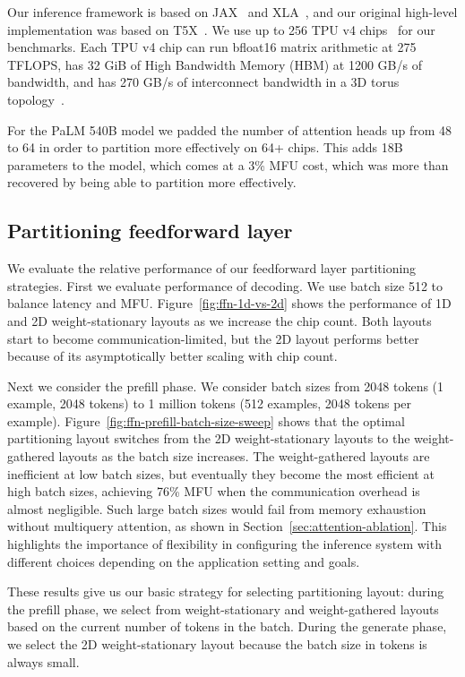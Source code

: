 Our inference framework is based on JAX~\cite{jax2018github} and XLA~\cite{XLA}, and our original high-level implementation was based on T5X~\cite{t5x2021github}. We use up to 256 TPU v4 chips~\cite{googlecloudtpu} for our benchmarks. Each TPU v4 chip can run bfloat16 matrix arithmetic at 275 TFLOPS, has 32 GiB of High Bandwidth Memory (HBM) at 1200 GB/s of bandwidth, and has 270 GB/s of interconnect bandwidth in a 3D torus topology~\cite{TPUv4}.

For the PaLM 540B model we padded the number of attention heads up from 48 to 64 in order to partition more effectively on 64+ chips. This adds 18B parameters to the model, which comes at a 3\% MFU cost, which was more than recovered by being able to partition more effectively.

\subsection{Partitioning feedforward layer}\label{sec:eval_ffn}
We evaluate the relative performance of our feedforward layer partitioning strategies. First we evaluate performance of decoding. We use batch size 512 to balance latency and MFU. Figure~\ref{fig:ffn-1d-vs-2d} shows the performance of 1D and 2D weight-stationary layouts as we increase the chip count. Both layouts start to become communication-limited, but the 2D layout performs better because of its asymptotically better scaling with chip count.

Next we consider the prefill phase. We consider batch sizes from 2048 tokens (1 example, 2048 tokens) to 1 million tokens (512 examples, 2048 tokens per example). Figure~\ref{fig:ffn-prefill-batch-size-sweep} shows that the optimal partitioning layout switches from the 2D weight-stationary layouts to the weight-gathered layouts as the batch size increases. The weight-gathered layouts are inefficient at low batch sizes, but eventually they become the most efficient at high batch sizes, achieving 76\% MFU when the communication overhead is almost negligible. Such large batch sizes would fail from memory exhaustion without multiquery attention, as shown in Section~\ref{sec:attention-ablation}. This highlights the importance of flexibility in configuring the inference system with different choices depending on the application setting and goals.

These results give us our basic strategy for selecting partitioning layout: during the prefill phase, we select from weight-stationary and weight-gathered layouts based on the current number of tokens in the batch. During the generate phase, we select the 2D weight-stationary layout because the batch size in tokens is always small. 

